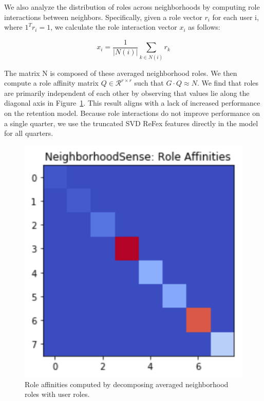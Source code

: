\documentclass[letterpaper, 12pt, conference]{ieeeconf}
\begin{document}
We also analyze the distribution of roles across neighborhoods by computing role interactions between neighbors. Specifically, given a role vector $r_i$ for each user i, where $1^T r_i = 1$, we calculate the role interaction vector $x_i$ as follows:

\begin{equation}
    x_i = \frac{1}{|N(i)|} \sum_{k \in N(i)} r_k
\end{equation}

The matrix N is composed of these averaged neighborhood roles. We then compute a role affinity matrix $Q \in \mathcal{R}^{r \times r}$ such that $G \cdot Q \approx N$. We find that roles are primarily independent of each other by observing that values lie along the diagonal axis in Figure~\ref{fig:neighborhood_sense}. This result aligns with a lack of increased performance on the retention model. Because role interactions do not improve performance on a single quarter, we use the truncated SVD ReFex features directly in the model for all quarters. 

\begin{figure}
    \centering
    \includegraphics[width=0.75\linewidth]{neighborhoodsense.png}
    \caption{Role affinities computed by decomposing averaged neighborhood roles with user roles.}
    \label{fig:neighborhood_sense}
\end{figure}
\end{document}
